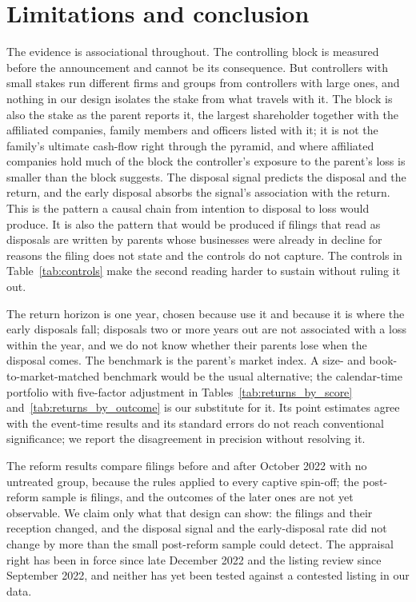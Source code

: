 \section{Limitations and conclusion}\label{sec:conclusion}

The evidence is associational throughout. The controlling block is measured before the announcement and cannot be its consequence. But controllers with small stakes run different firms and groups from controllers with large ones, and nothing in our design isolates the stake from what travels with it. The block is also the stake as the parent reports it, the largest shareholder together with the affiliated companies, family members and officers listed with it; it is not the family's ultimate cash-flow right through the pyramid, and where affiliated companies hold much of the block the controller's exposure to the parent's loss is smaller than the block suggests. The disposal signal predicts the disposal and the return, and the early disposal absorbs the signal's association with the return. This is the pattern a causal chain from intention to disposal to loss would produce. It is also the pattern that would be produced if filings that read as disposals are written by parents whose businesses were already in decline for reasons the filing does not state and the controls do not capture. The controls in Table~\ref{tab:controls} make the second reading harder to sustain without ruling it out.

The return horizon is one year, chosen because  use it and because it is where the early disposals fall; disposals two or more years out are not associated with a loss within the year, and we do not know whether their parents lose when the disposal comes. The benchmark is the parent's market index. A size- and book-to-market-matched benchmark would be the usual alternative; the calendar-time portfolio with five-factor adjustment in Tables~\ref{tab:returns_by_score} and~\ref{tab:returns_by_outcome} is our substitute for it. Its point estimates agree with the event-time results and its standard errors do not reach conventional significance; we report the disagreement in precision without resolving it.

The reform results compare filings before and after October 2022 with no untreated group, because the rules applied to every captive spin-off; the post-reform sample is \NPostFilings{} filings, and the outcomes of the later ones are not yet observable. We claim only what that design can show: the filings and their reception changed, and the disposal signal and the early-disposal rate did not change by more than the small post-reform sample could detect. The appraisal right has been in force since late December 2022 and the listing review since September 2022, and neither has yet been tested against a contested listing in our data.


